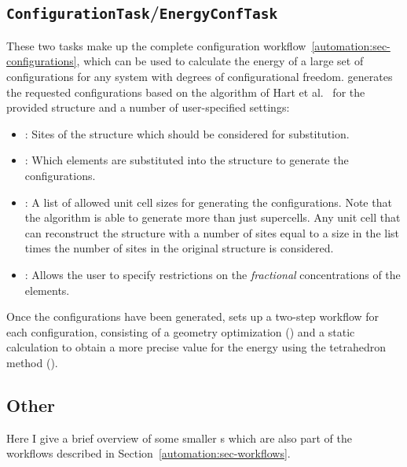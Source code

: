 \begin{refsection}
\subsection{\texttt{ConfigurationTask}/\texttt{EnergyConfTask}} 
\label{automation:sec-ConfigurationTask} \label{automation:sec-EnergyConfTask} 
 
These two tasks make up the complete configuration 
workflow~\ref{automation:sec-configurations}, which can be used to calculate the 
energy of a large set of configurations for any system with degrees of configurational freedom.
 generates the requested configurations based on the 
algorithm of Hart et al.~\cite{Hart2005} for the provided structure and a 
number of user-specified settings: 
 
\begin{itemize} 
\item {}: Sites of the structure which should 
be considered for substitution. 
\item {}: Which elements are substituted into the 
structure to generate the configurations. 
\item {} : A list of allowed unit cell sizes for generating 
the configurations. Note that the algorithm is able to generate more than just 
supercells. Any unit cell that can reconstruct the structure with a number of 
sites equal to a size in the list times the number of sites in the original 
structure is considered. 
\item {}: Allows the user to specify 
restrictions on the \textit{fractional} concentrations of the elements. 
\end{itemize} 
 
Once the configurations have been generated,  sets up a 
two-step workflow for each configuration, consisting of a geometry 
optimization () and a static calculation to obtain a more 
precise value for the energy using the tetrahedron method (). 
 
\subsection{Other} 
 
Here I give a brief overview of some smaller s which are also 
part of the workflows described in Section~\ref{automation:sec-workflows}.  
 

\end{refsection}
